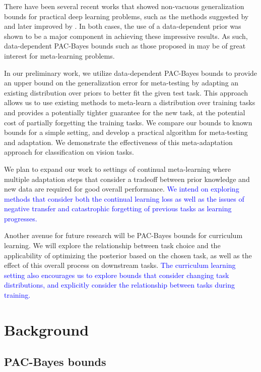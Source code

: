 \documentclass{article}
\theoremstyle{definition}
\newcommand{\LFe}[1]{\textcolor{blue}{#1}}
\begin{document}
There have been several recent works that showed non-vacuous generalization bounds for practical deep learning problems, such as the methods suggested by \citet{Dziugaite2017} and later improved by \citet{Perez-Ortiz2021}. In both cases, the use of a data-dependent prior was shown to be a major component in achieving these impressive results. As such, data-dependent PAC-Bayes bounds such as those proposed in \citet{Rivasplata2020} may be of great interest for meta-learning problems.

In our preliminary work, we utilize data-dependent PAC-Bayes bounds to provide an upper bound on the generalization error for meta-testing by adapting an existing distribution over priors to better fit the given test task. This approach allows us to use existing methods to meta-learn a distribution over training tasks and provides a potentially tighter guarantee for the new task, at the potential cost of partially forgetting the training tasks. 
We compare our bounds to known bounds for a simple setting, and develop a practical algorithm for meta-testing and adaptation. We demonstrate the effectiveness of this meta-adaptation approach for classification on vision tasks.

We plan to expand our work to settings of continual meta-learning where multiple adaptation steps that consider a tradeoff between prior knowledge and new data are required for good overall performance. \LFe{We intend on exploring methods that consider both the continual learning loss as well as the issues of negative transfer and catastrophic forgetting of previous tasks as learning progresses.}

Another avenue for future research will be PAC-Bayes bounds for curriculum learning. We will explore the relationship between task choice and the applicability of optimizing the posterior based on the chosen task, as well as the effect of this overall process on downstream tasks.
\LFe{The curriculum learning setting also encourages us to explore bounds that consider changing task distributions, and explicitly consider the relationship between tasks during training.}

\section{Background} %

\subsection{PAC-Bayes bounds}
\end{document}

